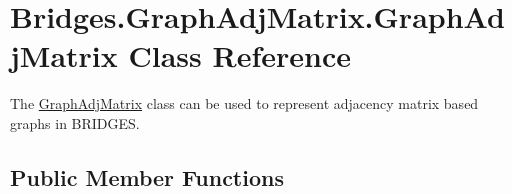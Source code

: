 \hypertarget{class_bridges_1_1_graph_adj_matrix_1_1_graph_adj_matrix}{}\section{Bridges.\+Graph\+Adj\+Matrix.\+Graph\+Adj\+Matrix Class Reference}
\label{class_bridges_1_1_graph_adj_matrix_1_1_graph_adj_matrix}


The \hyperlink{class_bridges_1_1_graph_adj_matrix_1_1_graph_adj_matrix}{Graph\+Adj\+Matrix} class can be used to represent adjacency matrix based graphs in B\+R\+I\+D\+G\+E\+S.  


\subsection*{Public Member Functions}
